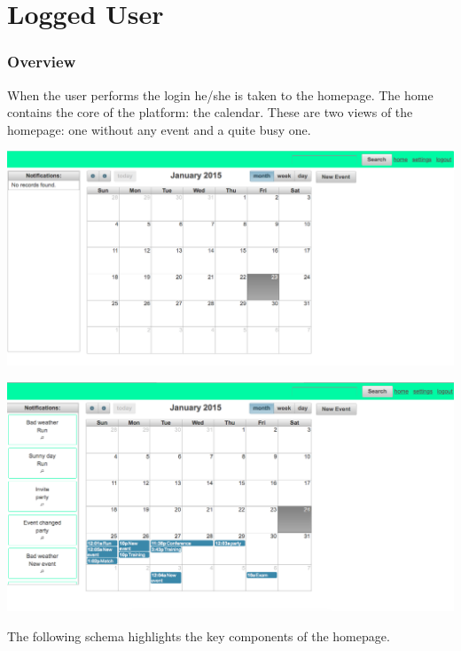 \documentclass[10pt,a4paper,titlepage]{article}
\begin{document}
\part{Logged User}

\section{Overview}
When the user performs the login he/she is taken to the homepage.
The home contains the core of the platform: the calendar. 
These are two views of the homepage: one without any event and a quite busy one.

\begin{center}
\includegraphics[width=\linewidth]{./images/04_calendar_empty.png}
\end{center}

\begin{center}
\includegraphics[width=\linewidth]{./images/05_calendar_busy.png}
\end{center}

The following schema highlights the key components of the homepage.
\end{document}
